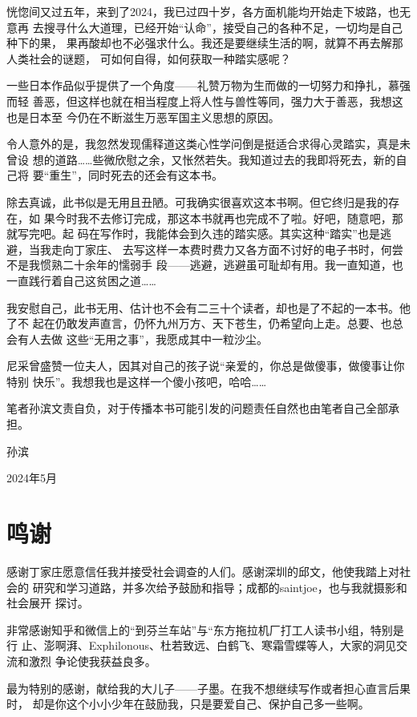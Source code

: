 恍惚间又过五年，来到了2024，我已过四十岁，各方面机能均开始走下坡路，也无意再
去搜寻什么大道理，已经开始“认命”，接受自己的各种不足，一切均是自己种下的果，
果再酸却也不必强求什么。我还是要继续生活的啊，就算不再去解那人类社会的谜题，
可如何自得，如何获取一种踏实感呢？

一些日本作品似乎提供了一个角度——礼赞万物为生而做的一切努力和挣扎，慕强而轻
善恶，但这样也就在相当程度上将人性与兽性等同，强力大于善恶，我想这也是日本至
今仍在不断滋生万恶军国主义思想的原因。

令人意外的是，我忽然发现儒释道这类心性学问倒是挺适合求得心灵踏实，真是未曾设
想的道路……些微欣慰之余，又怅然若失。我知道过去的我即将死去，新的自己将
要“重生”，同时死去的还会有这本书。

除去真诚，此书似是无用且丑陋。可我确实很喜欢这本书啊。但它终归是我的存在，如
果今时我不去修订完成，那这本书就再也完成不了啦。好吧，随意吧，那就写完吧。起
码在写作时，我能体会到久违的踏实感。其实这种“踏实”也是逃避，当我走向丁家庄、
去写这样一本费时费力又各方面不讨好的电子书时，何尝不是我惯熟二十余年的懦弱手
段——逃避，逃避虽可耻却有用。我一直知道，也一直践行着自己这贫困之道……

我安慰自己，此书无用、估计也不会有二三十个读者，却也是了不起的一本书。他了不
起在仍敢发声直言，仍怀九州万方、天下苍生，仍希望向上走。总要、也总会有人去做
这些“无用之事”，我愿成其中一粒沙尘。


尼采曾盛赞一位夫人，因其对自己的孩子说“亲爱的，你总是做傻事，做傻事让你特别
快乐”。我想我也是这样一个傻小孩吧，哈哈……

笔者孙滨文责自负，对于传播本书可能引发的问题责任自然也由笔者自己全部承担。

{\raggedleft

孙滨 \qquad\qquad \par

2024年5月 \quad}

\chapter{鸣谢}

感谢丁家庄愿意信任我并接受社会调查的人们。感谢深圳的邱文，他使我踏上对社会的
研究和学习道路，并多次给予鼓励和指导；成都的saintjoe，也与我就摄影和社会展开
探讨。

非常感谢知乎和微信上的“到芬兰车站”与“东方拖拉机厂打工人读书小组，特别是行
止、澎啊湃、Exphilonous、杜若致远、白鹤飞、寒霜雪蝶等人，大家的洞见交流和激烈
争论使我获益良多。


最为特别的感谢，献给我的大儿子——子墨。在我不想继续写作或者担心直言后果时，
却是你这个小小少年在鼓励我，只是要爱自己、保护自己多一些啊。

